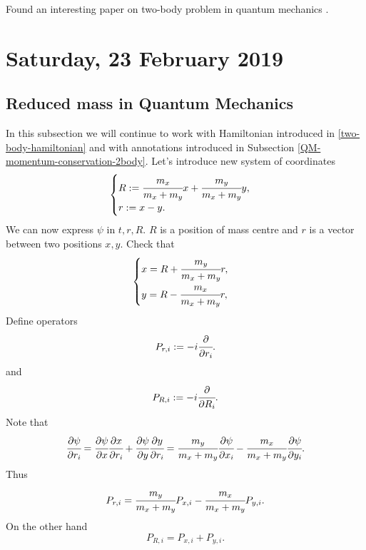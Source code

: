 \documentclass[main.tex]{subfiles}
\begin{document}
Found an interesting paper on two-body problem in quantum mechanics \cite{micu-hulubei2008}.
\section{Saturday, 23 February 2019}
\subsection{Reduced mass in Quantum Mechanics}
\label{reduced-mass-in-quantum}
In this subsection we will continue to work with Hamiltonian introduced in \ref{two-body-hamiltonian} and with annotations introduced in Subsection \ref{QM-momentum-conservation-2body}.
Let's introduce new system of coordinates
\begin{equation}
\begin{cases}
R := \cfrac{m_x}{m_x + m_y}x + \cfrac{m_y}{m_x + m_y}y,\\
r := x - y. 
\end{cases}
\end{equation}
We can now express $\psi$ in $t,r,R$. $R$ is a position of mass centre and $r$ is a vector between two positions $x,y$.
Check that
\begin{equation}
\begin{cases}
x = R + \cfrac{m_y}{m_x + m_y}r,\\
y = R - \cfrac{m_x}{m_x + m_y}r,
\end{cases}
\end{equation}
Define operators
\begin{equation}
P_{r,i}:= -i\cfrac{\partial}{\partial r_i}.
\end{equation}
and
\begin{equation}
P_{R,i}:= -i\cfrac{\partial}{\partial R_i}.
\end{equation}
Note that
\begin{equation}
\cfrac{\partial \psi}{\partial r_i} = \cfrac{\partial \psi}{\partial x}
\cfrac{\partial x}{\partial r_i} + \cfrac{\partial \psi}{\partial y}
\cfrac{\partial y}{\partial r_i} =  \cfrac{m_y}{m_x + m_y}\cfrac{\partial \psi}{\partial x_i} - \cfrac{m_x}{m_x + m_y}\cfrac{\partial \psi}{\partial y_i}. 
\end{equation}
Thus
\begin{equation}
P_{r,i} = \cfrac{m_y}{m_x + m_y}P_{x,i} - \cfrac{m_x}{m_x + m_y}P_{y,i}.
\end{equation}
On the other hand
\begin{equation}
P_{R,i} = P_{x,i} + P_{y,i}.
\end{equation}
\end{document}

